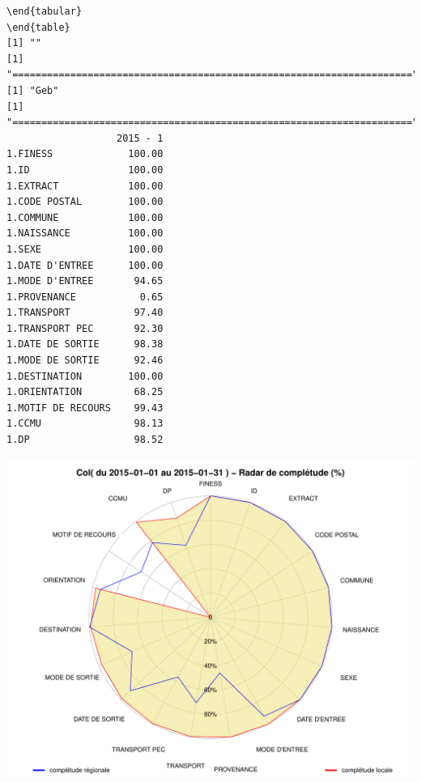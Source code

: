 \documentclass[]{article}
\begin{document}
\begin{verbatim}
\end{tabular} 
\end{table} 
[1] ""
[1] "====================================================================="
[1] "Geb"
[1] "====================================================================="
                   2015 - 1
1.FINESS             100.00
1.ID                 100.00
1.EXTRACT            100.00
1.CODE POSTAL        100.00
1.COMMUNE            100.00
1.NAISSANCE          100.00
1.SEXE               100.00
1.DATE D'ENTREE      100.00
1.MODE D'ENTREE       94.65
1.PROVENANCE           0.65
1.TRANSPORT           97.40
1.TRANSPORT PEC       92.30
1.DATE DE SORTIE      98.38
1.MODE DE SORTIE      92.46
1.DESTINATION        100.00
1.ORIENTATION         68.25
1.MOTIF DE RECOURS    99.43
1.CCMU                98.13
1.DP                  98.52
\end{verbatim}

\includegraphics{completude_files/figure-latex/finess-13.pdf}
\end{document}
